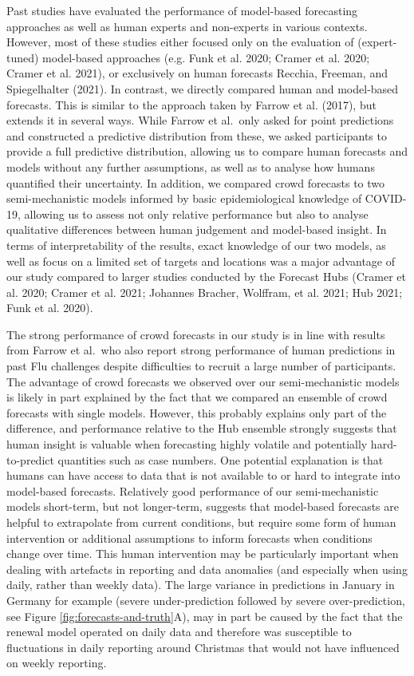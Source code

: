 \documentclass[
]{article}
\begin{document}
Past studies have evaluated the performance of model-based forecasting approaches as well as human experts and non-experts in various contexts. However, most of these studies either focused only on the evaluation of (expert-tuned) model-based approaches (e.g. Funk et al. 2020; Cramer et al. 2020; Cramer et al. 2021), or exclusively on human forecasts Recchia, Freeman, and Spiegelhalter (2021). In contrast, we directly compared human and model-based forecasts. This is similar to the approach taken by Farrow et al. (2017), but extends it in several ways. While Farrow et al.~only asked for point predictions and constructed a predictive distribution from these, we asked participants to provide a full predictive distribution, allowing us to compare human forecasts and models without any further assumptions, as well as to analyse how humans quantified their uncertainty. In addition, we compared crowd forecasts to two semi-mechanistic models informed by basic epidemiological knowledge of COVID-19, allowing us to assess not only relative performance but also to analyse qualitative differences between human judgement and model-based insight. In terms of interpretability of the results, exact knowledge of our two models, as well as focus on a limited set of targets and locations was a major advantage of our study compared to larger studies conducted by the Forecast Hubs (Cramer et al. 2020; Cramer et al. 2021; Johannes Bracher, Wolffram, et al. 2021; Hub 2021; Funk et al. 2020).

The strong performance of crowd forecasts in our study is in line with results from Farrow et al.~who also report strong performance of human predictions in past Flu challenges despite difficulties to recruit a large number of participants. The advantage of crowd forecasts we observed over our semi-mechanistic models is likely in part explained by the fact that we compared an ensemble of crowd forecasts with single models. However, this probably explains only part of the difference, and performance relative to the Hub ensemble strongly suggests that human insight is valuable when forecasting highly volatile and potentially hard-to-predict quantities such as case numbers. One potential explanation is that humans can have access to data that is not available to or hard to integrate into model-based forecasts. Relatively good performance of our semi-mechanistic models short-term, but not longer-term, suggests that model-based forecasts are helpful to extrapolate from current conditions, but require some form of human intervention or additional assumptions to inform forecasts when conditions change over time. This human intervention may be particularly important when dealing with artefacts in reporting and data anomalies (and especially when using daily, rather than weekly data). The large variance in predictions in January in Germany for example (severe under-prediction followed by severe over-prediction, see Figure \ref{fig:forecasts-and-truth}A), may in part be caused by the fact that the renewal model operated on daily data and therefore was susceptible to fluctuations in daily reporting around Christmas that would not have influenced on weekly reporting.
\end{document}
